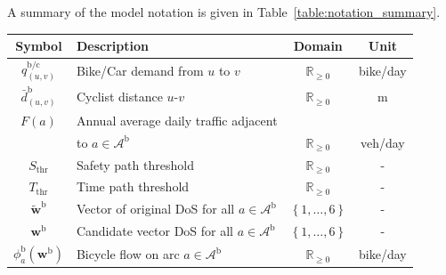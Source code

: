 \documentclass[lettersize,journal]{IEEEtran}
\begin{document}
A summary of the model notation is given in Table~\ref{table:notation_summary}.
\begin{table}[h!]
\centering
\vspace{0.2cm}
\scriptsize
\setlength{\tabcolsep}{4pt}
\renewcommand{\arraystretch}{0.92}
\begin{tabular}{c|l|c|c}
\hline
\textbf{Symbol} & \textbf{Description} & \textbf{Domain} & \textbf{Unit} \\ \hline
$q_{(u,v)}^{\mathrm{b}/\mathrm{c}}$ & Bike/Car demand from $u$ to $v$ & $\mathbb{R}_{\geq 0}$ & bike/day \\
$\bar{d}_{(u,v)}^\mathrm{b}$ & Cyclist distance $u$-$v$ & $\mathbb{R}_{\geq 0}$ & m \\ 
$F(a)$ & Annual average daily traffic adjacent  & & \\ 
& to $a\in \mathcal{A}^\mathrm{b}$ & $\mathbb{R}_{\geq 0}$ & veh/day \\ 
$S_{\text{thr}}$ & Safety path threshold & $\mathbb{R}_{\geq 0}$ & - \\ 
$T_{\text{thr}}$ & Time path threshold & $\mathbb{R}_{\geq 0}$ & - \\ 
$\tilde{\boldsymbol{w}}^\mathrm{b}$ & Vector of original DoS for all $a \in \mathcal{A}^\mathrm{b}$ & $\left \{ 1,\ldots, 6\right\}$ & - \\ 
$\boldsymbol{w}^\mathrm{b}$ & Candidate vector DoS for all $a\in \mathcal{A}^\mathrm{b}$ & $\left \{ 1,\ldots, 6\right\}$ & - \\ 
$\phi^\mathrm{b}_{a}(\boldsymbol{w}^\mathrm{b})$ & Bicycle flow on arc $a \in \mathcal{A}^\mathrm{b}$ & $\mathbb{R}_{\geq 0}$ & bike/day \\

\end{tabular}
\end{table}
\end{document}
